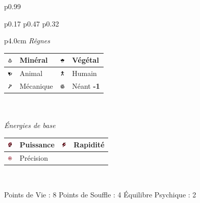 \documentclass[11pt,twoside,a4paper]{article}
\def\imgMINER{\includegraphics[width=0.25cm]{../../../../../imgGraphics/rolePlayingGame/SimulacreS/mini12x12/mineral.png} }
\def\imgVEGET{\includegraphics[width=0.25cm]{../../../../../imgGraphics/rolePlayingGame/SimulacreS/mini12x12/vegetal.png} }
\def\imgANIMA{\includegraphics[width=0.25cm]{../../../../../imgGraphics/rolePlayingGame/SimulacreS/mini12x12/animal.png} }
\def\imgHUMAI{\includegraphics[width=0.25cm]{../../../../../imgGraphics/rolePlayingGame/SimulacreS/mini12x12/humain.png} }
\def\imgMECAN{\includegraphics[width=0.25cm]{../../../../../imgGraphics/rolePlayingGame/SimulacreS/mini12x12/mecanique.png} }
\def\imgNEANT{\includegraphics[width=0.25cm]{../../../../../imgGraphics/rolePlayingGame/SimulacreS/mini12x12/neant.png} }
\def\imgPUISS{\includegraphics[width=0.25cm]{../../../../../imgGraphics/rolePlayingGame/SimulacreS/mini12x12/puissance.png} }
\def\imgRAPID{\includegraphics[width=0.25cm]{../../../../../imgGraphics/rolePlayingGame/SimulacreS/mini12x12/rapidite.png} }
\def\imgPRECI{\includegraphics[width=0.25cm]{../../../../../imgGraphics/rolePlayingGame/SimulacreS/mini12x12/precision.png} }
\begin{document}
\begin{longtable}[ht]{ p{} }
\begin{tabular}[h]{ p{} p{} p{} }
			\begin{tabular}[h]{ p{4.0cm} }
				\emph{R{\^e}gnes}  \\
				{\footnotesize %
				\begin{tabular}[h]{|p{0.25cm}|p{1.50cm}|p{0.25cm}|p{1.50cm}|}
					\hline
					\imgMINER 	& Min{\'e}ral		\newline 0	 & \imgVEGET	& V{\'e}g{\'e}tal		\newline 0					\\
					\hline
					\imgANIMA 	& Animal			\newline 0	 & \imgHUMAI	& Humain				\newline 1					\\
					\hline
					\imgMECAN	& M{\'e}canique		\newline 2	 & \imgNEANT	& N{\'e}ant				\newline \textbf{-1}		\\ 
					\hline
				\end{tabular} } \\
				\\
				\emph{{\'E}nergies de base} \\
				{\footnotesize %
				\begin{tabular}[h]{|p{0.25cm}|p{1.50cm}|p{0.25cm}|p{1.50cm}|}
					\hline
					\imgPUISS	& Puissance			\newline 0	 & \imgRAPID	& Rapidit{\'e}			\newline 2				\\
					\hline
					\imgPRECI	& Pr{\'e}cision		\newline 1	 &				&												\\
					\hline
				\end{tabular} } \\
			\end{tabular}
			\newline \newline \newline 
			Points de Vie : 8			\newline
			Points de Souffle : 4		\newline
			{\'E}quilibre Psychique : 2	\newline
		\\ %

\end{tabular}
\end{longtable}
\end{document}
